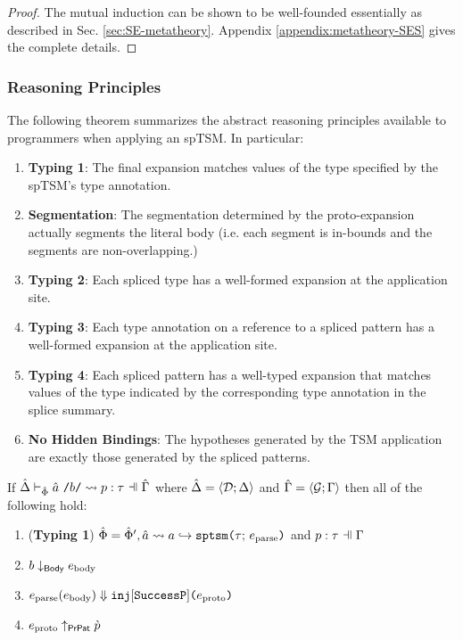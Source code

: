 {{{{\begin{proof}
The mutual induction can be shown to be well-founded essentially as described in Sec. \ref{sec:SE-metatheory}. Appendix \ref{appendix:metatheory-SES} gives the complete details.
\end{proof}

\subsubsection{Reasoning Principles}
The following theorem summarizes the abstract reasoning principles available to programmers when applying an spTSM. In particular:
\begin{enumerate}
  \item \textbf{Typing 1}: The final expansion matches values of the type specified by the spTSM's type annotation.
  \item \textbf{Segmentation}: The segmentation determined by the proto-expansion actually segments the literal body (i.e. each segment is in-bounds and the segments are non-overlapping.)
  \item \textbf{Typing 2}: Each spliced type has a well-formed expansion at the application site.
  \item \textbf{Typing 3}: Each type annotation on a reference to a spliced pattern has a well-formed expansion at the application site.
  \item \textbf{Typing 4}: Each spliced pattern has a well-typed expansion that matches values of the type indicated by the corresponding type annotation in the splice summary.
  \item \textbf{No Hidden Bindings}: The hypotheses generated by the TSM application are exactly those generated by the spliced patterns.
\end{enumerate}
\begingroup
\def\thetheorem{\ref{thm:spTSM-Typing-Segmentation}}
\begin{theorem}
If $\patExpands{\upctx}{\uPhi}{\utsmap{\tsmv}{b}}{p}{\tau}$ where $\hat{\Delta}=\langle \mathcal{D}; \Delta \rangle$ and $\hat{\Gamma}=\langle \mathcal{G}; \Gamma \rangle$ then all of the following hold:
\begin{enumerate}
        \item (\textbf{Typing 1}) $\hat\Phi=\hat\Phi', \hat{a} \leadsto a \hookrightarrow \texttt{sptsm}\texttt{(}\tau;\,e_\text{parse}\texttt{)}$ and $\patType{\pctx}{p}{\tau}$
        \item $b \downarrow_\mathsf{Body} e_\text{body}$
        \item $e_\text{parse}(e_\text{body}) \Downarrow \texttt{inj}[\mathtt{SuccessP}]\texttt{(}e_\text{proto}\texttt{)}$
        \item $e_\text{proto} \uparrow_\mathsf{PrPat} \grave{p}$

\end{enumerate}
\end{theorem}}}}}
